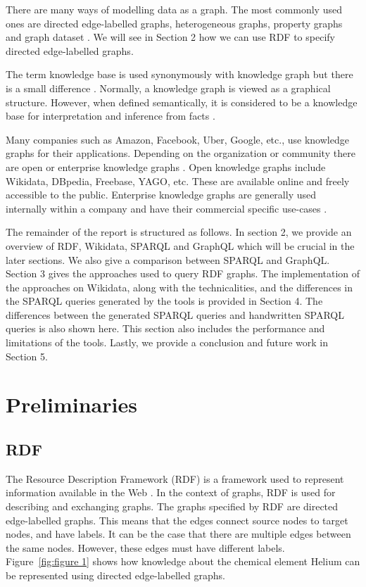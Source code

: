 \documentclass[12 pt, a4paper]{report}
\theoremstyle{definition}
\begin{document}
There are many ways of modelling data as a graph. The most commonly used ones are directed edge-labelled graphs, heterogeneous graphs, property graphs and graph dataset \cite{Hogan2021}. We will see in Section 2 how we can use RDF to specify directed edge-labelled graphs.

The term knowledge base is used synonymously with knowledge graph but there is a small difference \cite{Ji2022}. Normally, a knowledge graph is viewed as a graphical structure. However, when defined semantically, it is considered to be a knowledge base for interpretation and inference from facts \cite{Bordes2011}. 

Many companies such as Amazon, Facebook, Uber, Google, etc., use knowledge graphs for their applications. Depending on the organization or community there are open or enterprise knowledge graphs \cite{Hogan2021}. Open knowledge graphs include Wikidata, DBpedia, Freebase, YAGO, etc. These are available online and freely accessible to the public. Enterprise knowledge graphs are generally used internally within a company and have their commercial specific use-cases \cite{Hogan2021}.

The remainder of the report is structured as follows. In section 2, we provide an overview of RDF, Wikidata,  SPARQL and GraphQL which will be crucial in the later sections. We also give a comparison between SPARQL and GraphQL. Section 3 gives the approaches used to query RDF graphs. The implementation of the approaches on Wikidata, along with the technicalities, and the differences in the SPARQL queries generated by the tools is provided in Section 4. The differences between the generated SPARQL queries and handwritten SPARQL queries is also shown here. This section also includes the performance and limitations of the tools. Lastly, we provide a conclusion and future work in Section 5.

\section{Preliminaries}
\subsection{RDF}
The Resource Description Framework (RDF) is a framework used to represent information available in the Web \cite{R.Cyganiak2014}. In the context of graphs, RDF is used for describing and exchanging graphs. The graphs specified by RDF are directed edge-labelled graphs. This means that the edges connect source nodes to target nodes, and have labels. It can be the case that there are multiple edges between the same nodes. However, these edges must have different labels. Figure~\ref{fig:figure 1} shows how knowledge about the chemical element Helium can be represented using directed edge-labelled graphs.
\end{document}

